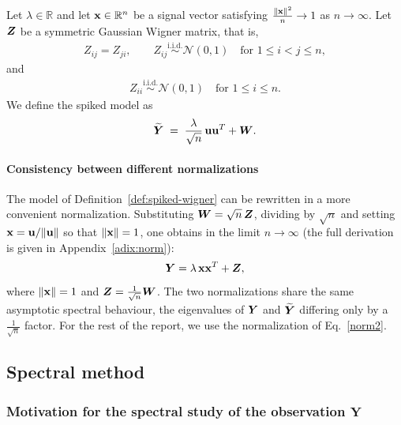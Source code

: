 \documentclass[11pt]{article}
\begin{document}
\begin{defn} \label{def:spiked-wigner}
Let $\lambda \in \mathbb{R}$ and let $\boldsymbol{\mathbf{x}} \in \mathbb{R}^n$ be a signal vector satisfying \(\frac{\|\boldsymbol{\mathbf{x}}\|^2}{n} \to 1\) as \(n \to \infty\). Let $\bm{Z}$ be a symmetric Gaussian Wigner matrix, that is,
\begin{align}
Z_{ij} = Z_{ji}, \qquad Z_{ij} \overset{\mathrm{i.i.d.}}{\sim} \mathcal N(0,1)    \quad \text{for } 1\le i<j\le n,
\end{align}
and
\begin{align}
Z_{ii} \overset{\mathrm{i.i.d.}}{\sim} \mathcal N(0,1) \quad \text{for } 1\le i\le n.
\end{align}
\noindent
We define the spiked model as
\begin{align}
    \widetilde{\bm{Y}} \;=\; \frac{\lambda}{\sqrt n}\,\boldsymbol{\mathbf{u}} \boldsymbol{\mathbf{u}}^T + \bm{W} .
\end{align}
\end{defn}

\paragraph{Consistency between different normalizations}
\noindent
The model of Definition~\ref{def:spiked-wigner} can be rewritten in a more convenient normalization. Substituting $\bm{W} = \sqrt{n}\,\bm{Z}$, dividing by $\sqrt n$ and setting $\boldsymbol{\mathbf{x}} = \boldsymbol{\mathbf{u}}/ \|\boldsymbol{\mathbf{u}} \|$ so that $ \|\boldsymbol{\mathbf{x}} \|=1$, one obtains in the limit $n\to\infty$ (the full derivation is given in Appendix~\ref{adix:norm}):
\begin{equation}
    \bm{Y} = \lambda \,\boldsymbol{\mathbf{x}} \boldsymbol{\mathbf{x}}^T + \bm{Z},
    \label{norm2}
\end{equation}
where $\|\boldsymbol{\mathbf{x}}\|=1$ and $\bm{Z} = \frac{1}{\sqrt n}\bm{W}$. The two normalizations share the same asymptotic spectral behaviour, the eigenvalues of $\bm{Y}$ and $\widetilde{\bm{Y}}$ differing only by a $\frac{1}{\sqrt{n}}$ factor. For the rest of the report, we use the normalization of Eq.~\eqref{norm2}.

\subsection{Spectral method }\label{subsec:single-spike}

\subsubsection{Motivation for the spectral study of the observation $\mathbf{Y}$ } \label{section:1pike_gard_H}
\end{document}
